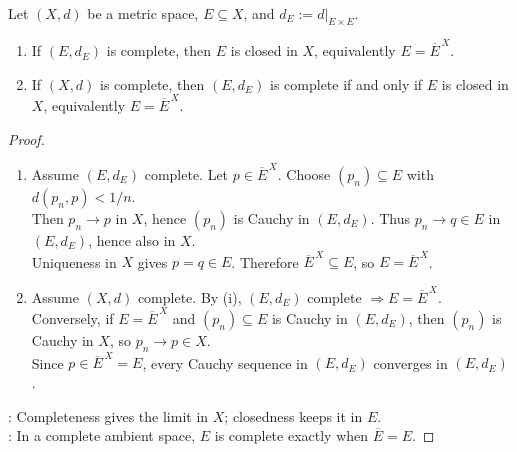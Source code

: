 \begin{proposition} \label{prop:basic-completeness-consequences} \\
Let $(X,d)$ be a metric space, $E\subseteq X$, and $d_E:=d|_{E\times E}$.
\begin{enumerate}[label=(\roman*)]
\setlength{\itemsep}{0pt}
\item If $(E,d_E)$ is complete, then $E$ is closed in $X$, equivalently $E=\overline{E}^{\,X}$.
\item If $(X,d)$ is complete, then $(E,d_E)$ is complete if and only if $E$ is closed in $X$, equivalently $E=\overline{E}^{\,X}$.
\end{enumerate}
\begin{proof}
\begin{enumerate}[label=(\roman*)]
\setlength{\itemsep}{0pt}
\item Assume $(E,d_E)$ complete. Let $p\in\overline{E}^{\,X}$. Choose $(p_n)\subseteq E$ with $d(p_n,p)<1/n$.\\
Then $p_n\to p$ in $X$, hence $(p_n)$ is Cauchy in $(E,d_E)$. Thus $p_n\to q\in E$ in $(E,d_E)$, hence also in $X$.\\
Uniqueness in $X$ gives $p=q\in E$. Therefore $\overline{E}^{\,X}\subseteq E$, so $E=\overline{E}^{\,X}$.
\item Assume $(X,d)$ complete. By (i), $(E,d_E)$ complete $\Rightarrow E=\overline{E}^{\,X}$.\\
Conversely, if $E=\overline{E}^{\,X}$ and $(p_n)\subseteq E$ is Cauchy in $(E,d_E)$, then $(p_n)$ is Cauchy in $X$, so $p_n\to p\in X$.\\
Since $p\in\overline{E}^{\,X}=E$, every Cauchy sequence in $(E,d_E)$ converges in $(E,d_E)$.
\end{enumerate}
: Completeness gives the limit in $X$; closedness keeps it in $E$.\\
: In a complete ambient space, $E$ is complete exactly when $\overline{E}=E$.
\end{proof}
\end{proposition}


